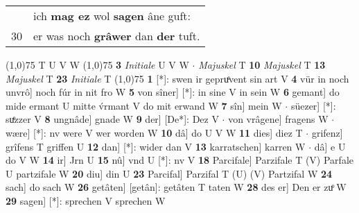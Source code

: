 \documentclass[8pt,a4paper,notitlepage]{article}
\begin{document}
\begin{table}[ht]
\begin{minipage}[t]{0.5\linewidth}
\begin{tabular}{rl}
 & ich \textbf{mag ez} wol \textbf{sagen} âne guft:\\ 
30 & er was noch \textbf{grâwer} dan \textbf{der} tuft.\\ 
\end{tabular}
\scriptsize
\line(1,0){75} \newline
T U V W \newline
\line(1,0){75} \newline
\textbf{3} \textit{Initiale} U V W   $\cdot$ \textit{Majuskel} T  \textbf{10} \textit{Majuskel} T  \textbf{13} \textit{Majuskel} T  \textbf{23} \textit{Initiale} T  \newline
\line(1,0){75} \newline
\textbf{1} [*]: swen ir gepruͤvent sin art V \textbf{4} vür in noch unvrô] noch fúr in nit fro W \textbf{5} von sîner] [*]: in sine V in sein W \textbf{6} gemant] do mide ermant U mitte v́rmant V do mit erwand W \textbf{7} sîn] mein W  $\cdot$ süezer] [*]: suͤzzer V \textbf{8} ungnâde] gnade W \textbf{9} der] [De*]: Dez V  $\cdot$ von vrâgene] fragens W  $\cdot$ wære] [*]: nv were V wer worden W \textbf{10} dâ] do U V W \textbf{11} dies] diez T  $\cdot$ grifenz] grîfens T griffen U \textbf{12} dan] [*]: wider dan V \textbf{13} karratschen] karren W  $\cdot$ dâ] e U do V W \textbf{14} ir] Jrn U \textbf{15} nû] vnd U [*]: nv V \textbf{18} Parcifale] Parzifale T (V) Parfale U partzifale W \textbf{20} diu] din U \textbf{23} Parcifal] Parzifal T (U) (V) Partzifal W \textbf{24} sach] do sach W \textbf{26} getâten] [getân]: getâten T taten W \textbf{28} des er] Den er zuͦ W \textbf{29} sagen] [*]: sprechen V sprechen W \newline
\end{minipage}
\end{table}
\end{document}
